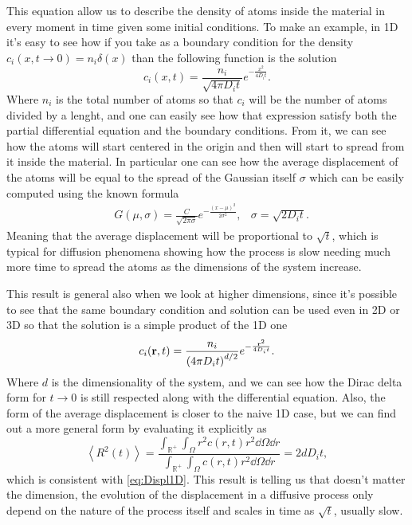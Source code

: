 \noindent
This equation allow us to describe the density of atoms inside the material in every moment in time given some initial conditions. To make an example, in 1D it's easy to see how if you take as a boundary condition for the density $c_i (x, t\to 0) = n_i\delta(x)$ than the following function is the solution
\begin{equation}
    c_i(x, t) = \frac{n_i}{\sqrt{4\pi D_it}}e^{-\frac{x^2}{4D_it}}.
\end{equation}
Where $n_i$ is the total number of atoms so that $c_i$ will be the number of atoms divided by a lenght, and one can easily see how that expression satisfy both the partial differential equation and the boundary conditions. From it, we can see how the atoms will start centered in the  origin and then will start to spread from it inside the material. In particular one can see how the average displacement of the atoms will be equal to the spread of the Gaussian itself $\sigma$ which can be easily computed using the known formula
\begin{align}
    \label{eq:Displ1D}
    &G(\mu, \sigma) = \frac{C}{\sqrt{2\pi\sigma}}e^{-\frac{(x - \mu)^2}{2\sigma^2}}, &\sigma = \sqrt{2D_it}.
\end{align}
Meaning that the average displacement will be proportional to $\sqrt{t}$, which is typical for diffusion phenomena showing how the process is slow needing much more time to spread the atoms as the dimensions of the system increase.

This result is general also when we look at higher dimensions, since it's possible to see that the same boundary condition and solution can be used even in 2D or 3D so that the solution is a simple product of the 1D one
\begin{equation}
    c_i(\vb{r}, t) = \frac{n_i}{\left( 4\pi D_it \right)^{d/2}}e^{-\frac{\vb{r}^2}{4D_it}}.
\end{equation}
Where $d$ is the dimensionality of the system, and we can see how the Dirac delta form for $t \to 0$ is still respected along with the differential equation. Also, the form of the average displacement is closer to the naive 1D case, but we can find out a more general form by evaluating it explicitly as
\begin{equation}
    \label{eq:DiffEquaModel}
    \left\langle R^2(t) \right\rangle = \frac{\int_{\mathbb{R}^+}\int_{\Omega}r^2c(r, t) r^2\dd \Omega\dd r}{\int_{\mathbb{R}^+}\int_{\Omega}c(r, t) r^2\dd \Omega\dd r} = 2dD_it,
\end{equation}
which is consistent with \eqref{eq:Displ1D}. This result is telling us that doesn't matter the dimension, the evolution of the displacement in a diffusive process only depend on the nature of the process itself and scales in time as $\sqrt{t}$, usually slow.

